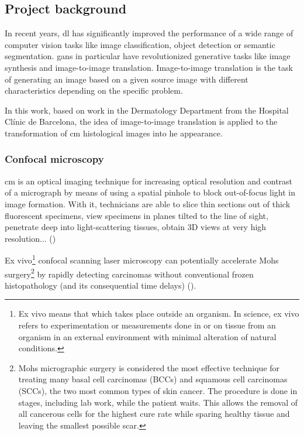\documentclass[../main.tex]{subfiles}
\begin{document}
\subsection{Project background}
\label{sec:project-background}

In recent years, \gls{dl} has significantly improved the
performance of a wide range of computer vision tasks like image classification,
object detection or semantic segmentation.
\gls{gans} in particular have revolutionized generative tasks like image synthesis
and image-to-image translation.
Image-to-image translation is the task of generating an image based on a
given source image with different characteristics depending on the specific problem.

In this work, based on \cite{Combalia2019} work in the Dermatology Department
from the Hospital Clínic de Barcelona, the idea of image-to-image translation
is applied to the transformation of \gls{cm} histological images into
\gls{he} appearance.

\subsubsection{Confocal microscopy}
\gls{cm} is an optical imaging technique for increasing optical resolution
and contrast of a micrograph by means of using a spatial pinhole to block
out-of-focus light in image formation. With it, technicians are able to slice
thin sections out of thick fluorescent specimens, view specimens
in planes tilted to the line of sight, penetrate deep into light-scattering
tissues, obtain 3D views at very high resolution... (\cite{Inoue2006})

Ex vivo\footnote{Ex vivo means that which takes place outside an organism.
In science, ex vivo refers to experimentation or measurements done in or on
tissue from an organism in an external environment with minimal alteration
of natural conditions.} confocal scanning laser microscopy can potentially
accelerate Mohs surgery\footnote{Mohs micrographic surgery is considered the
most effective technique for treating many basal cell carcinomas (BCCs) and
squamous cell carcinomas (SCCs), the two most common types of skin cancer.
The procedure is done in stages, including lab work, while the patient waits.
This allows the removal of all cancerous cells for the highest cure rate
while sparing healthy tissue and leaving the smallest possible scar.}
by rapidly detecting carcinomas without conventional frozen histopathology
(and its consequential time delays) (\cite{Chung2005}).
\end{document}
